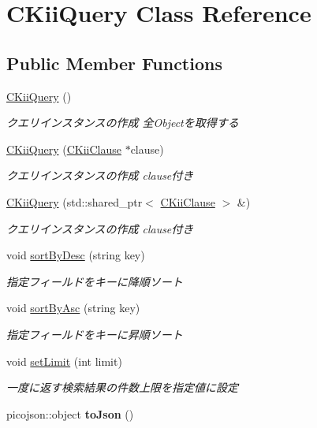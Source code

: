 \hypertarget{class_c_kii_query}{\section{C\-Kii\-Query Class Reference}
\label{class_c_kii_query}
}
\subsection*{Public Member Functions}
\begin{DoxyCompactItemize}
\item 
\hyperlink{class_c_kii_query_a0737372fcf004587373187ca68542896}{C\-Kii\-Query} ()
\begin{DoxyCompactList}\small\item\em クエリインスタンスの作成 全\-Objectを取得する \end{DoxyCompactList}\item 
\hyperlink{class_c_kii_query_af8c785977498347d465270e832a6c893}{C\-Kii\-Query} (\hyperlink{class_c_kii_clause}{C\-Kii\-Clause} $\ast$clause)
\begin{DoxyCompactList}\small\item\em クエリインスタンスの作成 clause付き \end{DoxyCompactList}\item 
\hyperlink{class_c_kii_query_a8a80df35bb8f6012cfd237fc25c0e94d}{C\-Kii\-Query} (std\-::shared\-\_\-ptr$<$ \hyperlink{class_c_kii_clause}{C\-Kii\-Clause} $>$ \&)
\begin{DoxyCompactList}\small\item\em クエリインスタンスの作成 clause付き \end{DoxyCompactList}\item 
void \hyperlink{class_c_kii_query_a9c12f9a838e8ef8be9b9e63b9116e141}{sort\-By\-Desc} (string key)
\begin{DoxyCompactList}\small\item\em 指定フィールドをキーに降順ソート \end{DoxyCompactList}\item 
void \hyperlink{class_c_kii_query_aa6d34fc6bf6151bdd644eb19eceb1431}{sort\-By\-Asc} (string key)
\begin{DoxyCompactList}\small\item\em 指定フィールドをキーに昇順ソート \end{DoxyCompactList}\item 
void \hyperlink{class_c_kii_query_ac32a445dba5a48478ee9a8b920d732d3}{set\-Limit} (int limit)
\begin{DoxyCompactList}\small\item\em 一度に返す検索結果の件数上限を指定値に設定 \end{DoxyCompactList}\item 
\hypertarget{class_c_kii_query_ac53af6cfaed9bbdc0a2a3d414bf358f2}{picojson\-::object {\bfseries to\-Json} ()}\label{class_c_kii_query_ac53af6cfaed9bbdc0a2a3d414bf358f2}


\end{DoxyCompactItemize}
